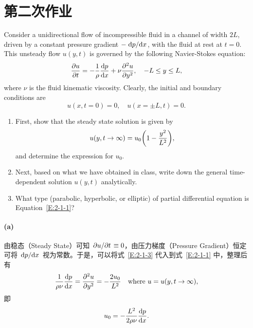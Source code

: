 \section{第二次作业}

\begin{homework}[label={H:2-1}]
    Consider a unidirectional flow of incompressible fluid in a channel of width $2L$, driven by a constant pressure gradient $-\dv*{p}{x}$, with the fluid at rest at $t=0$. This unsteady flow $u(y, t)$ is governed by the following Navier-Stokes equation:
    \begin{equation}\label{E:2-1-1}
        \pdv{u}{t} = -\frac{1}{\rho}\dv{p}{x} + \nu\pdv[2]{u}{y},
        \quad
        -L\leq y\leq L,
    \end{equation}
    where $\nu$ is the fluid kinematic viscosity. Clearly, the initial and boundary conditions are
    \begin{equation}\label{E:2-1-2}
        u(x, t=0) = 0,
        \quad
        u(x=\pm L, t) = 0.
    \end{equation}

    \begin{enumerate}[label=(\alph*)]
        \item First, show that the steady state solution is given by
            \begin{equation}\label{E:2-1-3}
                u(y, t\to\infty) = u_0\qty(1-\frac{y^2}{L^2}),
            \end{equation}
            and determine the expression for $u_0$.
        \item Next, based on what we have obtained in class, write down the general time-dependent solution $u(y, t)$ analytically.
        \item What type (parabolic, hyperbolic, or elliptic) of partial differential equation is Equation~\eqref{E:2-1-1}?
    \end{enumerate}
\end{homework}

\paragraph{(a)}
由稳态（Steady State）可知 $\pdv*{u}{t}\equiv 0$，由压力梯度（Pressure Gradient）恒定可将 $\dv*{p}{x}$ 视为常数。于是，可以将式~\eqref{E:2-1-3} 代入到式~\eqref{E:2-1-1} 中，整理后有
\begin{equation*}
    \frac{1}{\rho\nu}\dv{p}{x} = \pdv[2]{u}{y} = -\frac{2u_0}{L^2}
    \quad
    \text{where } u=u(y, t\to\infty),
\end{equation*}
即
\begin{equation*}
    u_0 = -\frac{L^2}{2\rho\nu}\dv{p}{x}.
\end{equation*}


